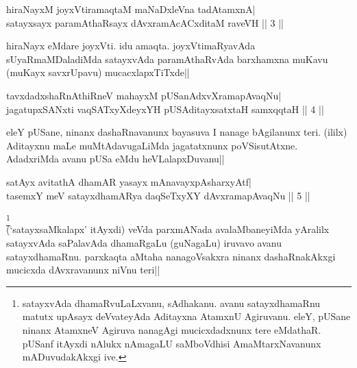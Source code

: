 
\begin{shl}
hiraNayxM joyxVtiramaqtaM maNaDxleVna tadAtamxnA| \\
satayxsayx paramAthaRsayx dAvxramAcACxditaM raveVH \hfill||  3 || 
\end{shl}

\begin{artha} 
hiraNayx eMdare joyxVti. idu amaqta. joyxVtimaRyavAda 
sUyaRmaMDaladiMda satayxvAda paramAthaRvAda barxhamxna muKavu (muKayx 
savxrUpavu) mucacxlapxTiTxde||
\end{artha}


\begin{shl}
tavxdadxshaRnAthiRneV mahayxM pUSanAdxvXramapAvaqNu| \\
jagatupxSANxti vaqSATxyXdeyxYH pUSA\s \s ditayxsatxtaH samxqqtaH \hfill||  4 || 
\end{shl}

\begin{artha} 
eleY pUSane, ninanx dashaRnavanunx bayasuva I nanage bAgilanunx teri. 
(ililx) Aditayxnu maLe muMtAdavugaLiMda jagatatxnunx poVSisutAtxne. 
AdadxriMda avanu pUSa eMdu heVLalapxDuvanu||
\end{artha}


\begin{shl}
satAyx avitathA dhamAR yasayx mAnavayxpAsharxyAtf| \\
tasemxY meV satayxdhamARya daqSeTxyXY dAvxramapAvaqNu \hfill||  5 || 
\end{shl}

\begin{artha} 
\footnote[1]{satayxvAda dhamaRvuLaLxvanu, sAdhakanu. avanu 
satayxdhamaRnu matutx upAsayx deVvateyAda Aditayxna AtamxnU Agiruvanu. 
eleY, pUSane ninanx AtamxneV Agiruva nanagAgi mucicxdadxnunx tere 
eMdathaR. pUSanf itAyxdi nAlukx nAmagaLU saMboVdhisi AmaMtarxNavanunx 
mADuvudakAkxgi ive.}\\
(`satayxsaMkalapx' itAyxdi) veVda parxmANada avalaMbaneyiMda yAralilx 
satayxvAda saPalavAda dhamaRgaLu (guNagaLu) iruvavo avanu 
satayxdhamaRnu. parxkaqta aMtaha nanagoVsakxra ninanx dashaRnakAkxgi 
mucicxda dAvxravanunx niVnu teri||
\end{artha}

